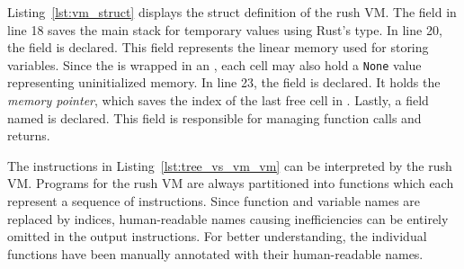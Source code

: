 
Listing~\ref{lst:vm_struct} displays the struct definition of the rush VM\@.
The  field in line 18 saves the main stack for temporary values using Rust's  type.
In line 20, the  field is declared.
This field represents the linear memory used for storing variables.
Since the  is wrapped in an , each cell may also hold a \texttt{None} value representing uninitialized memory.
In line 23, the  field is declared.
It holds the \emph{memory pointer}, which saves the index of the last free cell in .
Lastly, a field named  is declared.
This field is responsible for managing function calls and returns.

The instructions in Listing~\ref{lst:tree_vs_vm_vm} can be interpreted by the rush VM\@.
Programs for the rush VM are always partitioned into functions which each represent a sequence of instructions.
Since function and variable names are replaced by indices, human-readable names causing inefficiencies can be entirely omitted in the output instructions.
For better understanding, the individual functions have been manually annotated with their human-readable names.

